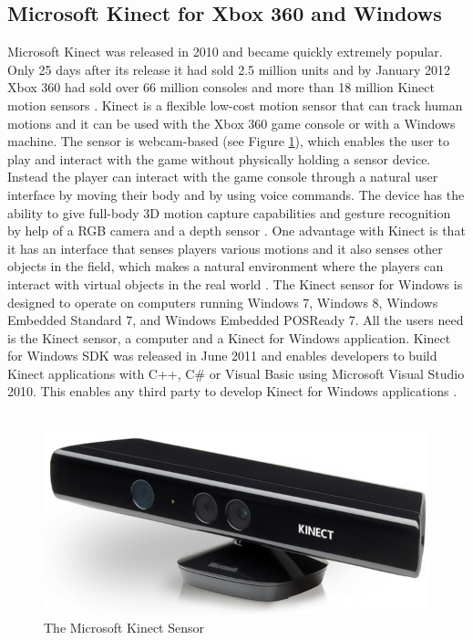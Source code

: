 \subsection{Microsoft Kinect for Xbox 360 and Windows}
Microsoft Kinect was released in 2010 and became quickly extremely popular. Only 25 days after its release it had sold 2.5 million units and by January 2012 Xbox 360 had sold over 66 million consoles and more than 18 million Kinect motion sensors \cite{consoles} \cite{kinectsold}. Kinect is a flexible low-cost motion sensor that can track human motions and it can be used with the Xbox 360 game console or with a Windows machine.  The sensor is webcam-based (see Figure \ref{fig:KinectSensor}), which enables the user to play and interact with the game without physically holding a sensor device. Instead the player can interact with the game console through a natural user interface by moving their body and by using voice commands. The device has the ability to give full-body 3D motion capture capabilities and gesture recognition by help of a RGB camera and a depth sensor \cite{kinect}. One advantage with Kinect is that it has an interface that senses players various motions and it also senses other objects in the field, which makes a natural environment where the players can interact with virtual objects in the real world \cite{comparison}. The Kinect sensor for Windows is designed to operate on computers running Windows 7, Windows 8, Windows Embedded Standard 7, and Windows Embedded POSReady 7. All the users need is the Kinect sensor, a computer and a Kinect for Windows application. Kinect for Windows SDK was released in June 2011 and enables developers to build Kinect applications with C++, C\# or Visual Basic using Microsoft Visual Studio 2010. This enables any third party to develop Kinect for Windows applications \cite{kinectwindows}.\\ \\
\begin{figure}[h!]
\begin{center}
\includegraphics[scale=0.3]{kinect}
\caption[Kinect Sensor]{The Microsoft Kinect Sensor}
\label{fig:KinectSensor}
\end{center}
\end{figure}

